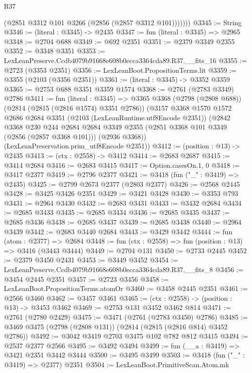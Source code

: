 \begin{lexlean}{R37}
\begin{coremodule}
            (@2851 @3312 @101 @3266 (@2856 (@2857 @3312 @101)))))))
@3345 := String
@3346 := (literal : @3345) -> @2435
@3347 := fun (literal : @3345) => @2965
@3348 := @2704 @688
@3349 := @692 @2351
@3351 := @2379 @3349 @2355
@3352 := @3348 @3351
@3353 := LexLeanPreserve.Ccdb4079b91668e608b0ecca3364cda89.R37.__fits_16
@3355 := @2723 (@3353 @2351)
@3356 := LexLeanBoot.PropositionTerms.lit
@3359 := @3355 (@2103 (@3356 @2351))
@3361 := (literal : @3345) -> @3352 @3359
@3365 := @2753 @688 @3351 @3359 @1574
@3368 := @2761 (@2783 @3349) @2786
@3411 := fun (literal : @3345) =>
  @3365
    @3368
    (@2798 (@2808 @688))
    (@2814 (@2815 (@2816 @1574) @3351 @2786))
    (@3157
      @3368
      @1570
      @1572
      @2686
      @2684
      @3351
      (@2103 (LexLeanRuntime.utf8Encode @2351))
      (@2842
        @3368
        @230
        @244
        @2684
        @2684
        @3349
        @2355
        (@2851 @3368 @101 @3349 (@2856 (@2857 @3368 @101)))
        (@2936 @3368))
      (LexLeanPreservation.prim_utf8Encode @2351))
@3412 := (position : @13) -> @2435
@3413 := (ctx : @2558) -> @3412
@3414 := @2683 @2687
@3415 := @3414 @2684
@3416 := @2683 @3415
@3417 := Option.casesOn.{1, 0}
@3418 := @3417 @2377
@3419 := @2796 @2377
@3421 := @3418 (fun ("_" : @3419) => @2435)
@3425 := @2799 @2673 @2377 (@2803 @2377)
@3426 := @2568 @2445
@3428 := @3425 @3426 @2351
@3429 := @3421 @3428
@3430 := @3353 @793
@3431 := @2964 @3430
@3432 := @2683 @3431
@3433 := @3432 @2684
@3434 := @2685 @3433
@3435 := @2685 @3434
@3436 := @2685 @3435
@3437 := @2685 @3436
@3438 := @2685 @3437
@3439 := @2685 @3438
@3440 := @2964 @3439
@3442 := @2683 @3440 @2684
@3443 := @3429 @3442
@3444 := fun (atom : @2377) => @2684
@3448 := fun (ctx : @2558) => fun (position : @13) => @3416 (@3443 @3444)
@3449 := @2704 @131
@3450 := @2733 @2445
@3452 := @2379 @3450 @2431
@3453 := @3449 @3452
@3454 := LexLeanPreserve.Ccdb4079b91668e608b0ecca3364cda89.R37.__fits_8
@3456 := @3454 @2445 @2351
@3457 := @2723 @3456
@3458 := LexLeanBoot.PropositionTerms.atomOr
@3460 := @3458 @2445 @2351
@3461 := @2566 @3460
@3462 := @3457 @3461
@3465 := (ctx : @2558) -> (position : @13) -> @3453 @3462
@3469 := @2753 @131 @3452 @3462 @814
@3471 := @2761 (@2780 @2429)
@3475 := @3471 (@2761 (@2783 @3450) @2786)
@3485 := @3469 @3475 (@2798 (@2808 @131)) (@2814 (@2815 (@2816 @814) @3452 @2786))
@3492 := @3042 @3419 @2703 @3475 @102 @782 @812 @3415
@3494 := @2537 @2377 @2566
@3495 := @3492 @3494
@3499 := fun (__a : @3419) => @3421 @2351 @3442 @3444
@3500 := @3495 @3499
@3503 := @3418 (fun ("_" : @3419) => @2377) @2351
@3504 := LexLeanBoot.PrimitiveScan.Atom.mk

\end{coremodule}
\end{lexlean}
